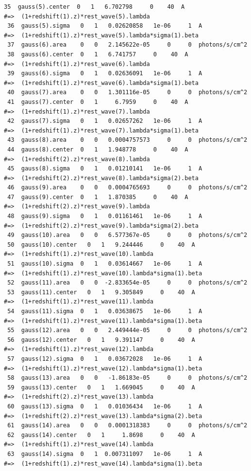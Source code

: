 \begin{lstlisting}[breaklines]
 35  gauss(5).center  0   1   6.702798     0    40  A
#=>  (1+redshift(1).z)*rest_wave(5).lambda
 36  gauss(5).sigma   0   1   0.02620858   1e-06     1  A
#=>  (1+redshift(1).z)*rest_wave(5).lambda*sigma(1).beta
 37  gauss(6).area    0   0   2.145622e-05     0     0  photons/s/cm^2
 38  gauss(6).center  0   1   6.741757     0    40  A
#=>  (1+redshift(1).z)*rest_wave(6).lambda
 39  gauss(6).sigma   0   1   0.02636091   1e-06     1  A
#=>  (1+redshift(1).z)*rest_wave(6).lambda*sigma(1).beta
 40  gauss(7).area    0   0   1.301116e-05     0     0  photons/s/cm^2
 41  gauss(7).center  0   1     6.7959     0    40  A
#=>  (1+redshift(1).z)*rest_wave(7).lambda
 42  gauss(7).sigma   0   1   0.02657262   1e-06     1  A
#=>  (1+redshift(1).z)*rest_wave(7).lambda*sigma(1).beta
 43  gauss(8).area    0   0   0.0004757573     0     0  photons/s/cm^2
 44  gauss(8).center  0   1   1.948778     0    40  A
#=>  (1+redshift(2).z)*rest_wave(8).lambda
 45  gauss(8).sigma   0   1   0.01210141   1e-06     1  A
#=>  (1+redshift(2).z)*rest_wave(8).lambda*sigma(2).beta
 46  gauss(9).area    0   0   0.0004765693     0     0  photons/s/cm^2
 47  gauss(9).center  0   1   1.870385     0    40  A
#=>  (1+redshift(2).z)*rest_wave(9).lambda
 48  gauss(9).sigma   0   1   0.01161461   1e-06     1  A
#=>  (1+redshift(2).z)*rest_wave(9).lambda*sigma(2).beta
 49  gauss(10).area   0   0   6.577367e-05     0     0  photons/s/cm^2
 50  gauss(10).center   0   1   9.244446     0    40  A
#=>  (1+redshift(1).z)*rest_wave(10).lambda
 51  gauss(10).sigma  0   1   0.03614667   1e-06     1  A
#=>  (1+redshift(1).z)*rest_wave(10).lambda*sigma(1).beta
 52  gauss(11).area   0   0  -2.833654e-05     0     0  photons/s/cm^2
 53  gauss(11).center   0   1   9.305849     0    40  A
#=>  (1+redshift(1).z)*rest_wave(11).lambda
 54  gauss(11).sigma  0   1   0.03638675   1e-06     1  A
#=>  (1+redshift(1).z)*rest_wave(11).lambda*sigma(1).beta
 55  gauss(12).area   0   0   2.449444e-05     0     0  photons/s/cm^2
 56  gauss(12).center   0   1   9.391147     0    40  A
#=>  (1+redshift(1).z)*rest_wave(12).lambda
 57  gauss(12).sigma  0   1   0.03672028   1e-06     1  A
#=>  (1+redshift(1).z)*rest_wave(12).lambda*sigma(1).beta
 58  gauss(13).area   0   0   -1.86183e-05     0     0  photons/s/cm^2
 59  gauss(13).center   0   1   1.669045     0    40  A
#=>  (1+redshift(2).z)*rest_wave(13).lambda
 60  gauss(13).sigma  0   1   0.01036434   1e-06     1  A
#=>  (1+redshift(2).z)*rest_wave(13).lambda*sigma(2).beta
 61  gauss(14).area   0   0   0.0001318383     0     0  photons/s/cm^2
 62  gauss(14).center   0   1     1.8698     0    40  A
#=>  (1+redshift(1).z)*rest_wave(14).lambda
 63  gauss(14).sigma  0   1  0.007311097   1e-06     1  A
#=>  (1+redshift(1).z)*rest_wave(14).lambda*sigma(1).beta
\end{lstlisting}



